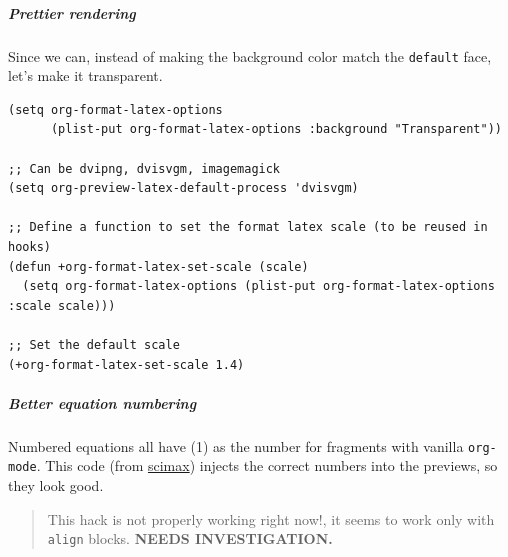 \documentclass[11pt]{article}
\begin{document}
\subparagraph{Prettier rendering}
\label{sec:orgbf8ad09}
Since we can, instead of making the background color match the \texttt{default} face,
let's make it transparent.

\begin{verbatim}
(setq org-format-latex-options
      (plist-put org-format-latex-options :background "Transparent"))

;; Can be dvipng, dvisvgm, imagemagick
(setq org-preview-latex-default-process 'dvisvgm)

;; Define a function to set the format latex scale (to be reused in hooks)
(defun +org-format-latex-set-scale (scale)
  (setq org-format-latex-options (plist-put org-format-latex-options :scale scale)))

;; Set the default scale
(+org-format-latex-set-scale 1.4)
\end{verbatim}

\subparagraph{Better equation numbering}
\label{sec:org926b7f3}
Numbered equations all have (1) as the number for fragments with vanilla
\texttt{org-mode}. This code (from \href{https://github.com/jkitchin/scimax}{scimax}) injects the correct numbers into the previews,
so they look good.

\begin{quote}
This hack is not properly working right now!, it seems to work only with \texttt{align}
blocks. \textbf{NEEDS INVESTIGATION.}
\end{quote}
\end{document}
